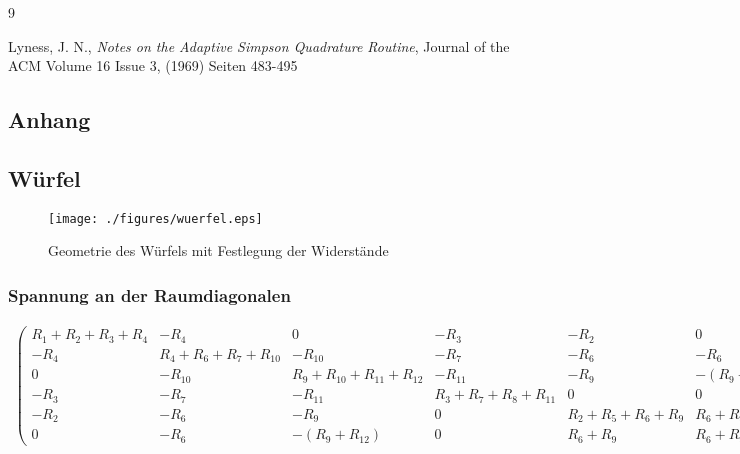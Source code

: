 \documentclass[10pt,a4paper]{article}
\begin{document}
\begin{thebibliography}{9}

 Lyness, J. N.,
 \emph{Notes on the Adaptive Simpson Quadrature Routine},
Journal of the ACM
Volume 16 Issue 3, (1969) 
Seiten 483-495 

\end{thebibliography}
\begin{landscape}
\thispagestyle{empty}
\appendix
\section{Anhang}
\subsection{Würfel}
\begin{figure}[htbp!]
\centering
\texttt{[image: ./figures/wuerfel.eps]}
\caption{Geometrie des Würfels mit Festlegung der Widerstände}
\label{fig:geometrie_wuerfel}
\end{figure}
\subsubsection{Spannung an der Raumdiagonalen}
\begin{align}
\begin{pmatrix}
R_1+R_2+R_3+R_4 &  -R_4  &  0  &  -R_3  &  -R_2  &  0  \\ 
-R_4 & R_4+R_6+R_7+R_{10} & -R_{10} & -R_7 & -R_6 & -R_6 \\ 
 0  & -R_{10} & R_9+R_{10}+R_{11}+R_{12} & -R_{11} & -R_9 & -(R_9+R_{12}) \\ 
-R_3 & -R_7 & -R_11 & R_3+R_7+R_8+R_{11} & 0 & 0 \\ 
-R_2 & -R_6 & -R_9 & 0 & R_2+R_5+R_6+R_9 & R_6+R_9 \\ 
 0  & -R_6 & -(R_9+R_{12}) &  0  & R_6+R_9 & R_6+R_9+R_{12}
\end{pmatrix}
\begin{pmatrix}
I_1\\I_2\\I_3\\I_4\\I_5\\I_{ges}
\end{pmatrix}
=
\begin{pmatrix}
0\\0\\0\\0\\0\\U
\end{pmatrix}
\label{eqn:wuerfel_ganz}
\end{align}


\end{landscape}
\end{document}
